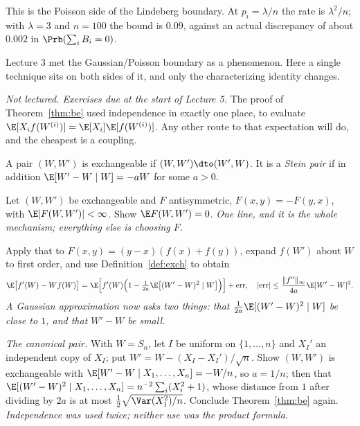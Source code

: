 \documentclass[11pt]{article}
\begin{document}
This is the Poisson side of the Lindeberg boundary. At $p_i=\lambda/n$ the rate is $\lambda^2/n$; with $\lambda=3$ and $n=100$ the bound is $0.09$, against an actual discrepancy of about $0.002$ in $\Prb(\sum_iB_i=0)$.

Lecture 3 met the Gaussian/Poisson boundary as a phenomenon. Here a single technique sits on both sides of it, and only the characterizing identity changes.

\label{sec:dependence}

\emph{Not lectured. Exercises due at the start of Lecture 5.} The proof of Theorem~\ref{thm:be} used independence in exactly one place, to evaluate $\E[X_if(W^{(i)})]=\E[X_i]\E[f(W^{(i)})]$. Any other route to that expectation will do, and the cheapest is a coupling.

\begin{definition}\label{def:exch}
A pair $(W,W')$ is exchangeable if $(W,W')\dto(W',W)$. It is a \emph{Stein pair} if in addition $\E[W'-W\mid W]=-a W$ for some $a>0$.
\end{definition}

\begin{exercise}[\ty{A}]
Let $(W,W')$ be exchangeable and $F$ antisymmetric, $F(x,y)=-F(y,x)$, with $\E|F(W,W')|<\infty$. Show $\E F(W,W')=0$. \emph{One line, and it is the whole mechanism; everything else is choosing $F$.}
\end{exercise}

\begin{exercise}[\ty{B}]
Apply that to $F(x,y)=(y-x)(f(x)+f(y))$, expand $f(W')$ about $W$ to first order, and use Definition~\ref{def:exch} to obtain
\[
\E\big[f'(W)-Wf(W)\big]=\E\Big[f'(W)\Big(1-\tfrac{1}{2a}\E\big[(W'-W)^2\mid W\big]\Big)\Big]+\mathrm{err},\quad|\mathrm{err}|\le\frac{\|f''\|_\infty}{4a}\E|W'-W|^3 .
\]
\emph{A Gaussian approximation now asks two things: that $\frac{1}{2a}\E[(W'-W)^2\mid W]$ be close to $1$, and that $W'-W$ be small.}
\end{exercise}

\begin{exercise}[\ty{B}]
\emph{The canonical pair.} With $W=S_n$, let $I$ be uniform on $\{1,\dots,n\}$ and $X_I'$ an independent copy of $X_I$; put $W'=W-(X_I-X_I')/\sqrt n$. Show $(W,W')$ is exchangeable with $\E[W'-W\mid X_1,\dots,X_n]=-W/n$, so $a=1/n$; then that $\E[(W'-W)^2\mid X_1,\dots,X_n]=n^{-2}\sum_i(X_i^2+1)$, whose distance from $1$ after dividing by $2a$ is at most $\tfrac12\sqrt{\Var(X_1^2)/n}$. Conclude Theorem~\ref{thm:be} again. \emph{Independence was used twice; neither use was the product formula.}
\end{exercise}
\end{document}
